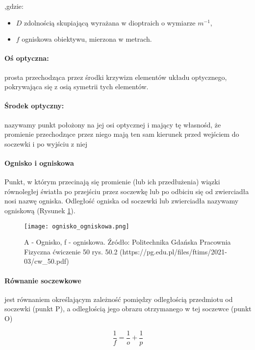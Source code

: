 \documentclass{article}
\begin{document}
,gdzie: 

\renewcommand{\labelitemi}{--}   %
\begin{itemize}
    \item $D$ zdolnością skupiającą wyrażana w dioptraich o wymiarze $m^{-1}$,
    \item $f$ ogniskowa obiektywu, mierzona w metrach.
\end{itemize}

\paragraph{Oś optyczna:}prosta przechodząca przez środki krzywizn elementów układu optycznego, pokrywająca się z osią symetrii tych elementów.

\paragraph{Środek optyczny:}nazywamy punkt położony na jej osi optycznej i mający tę własnośd, że promienie przechodzące przez niego mają ten sam kierunek przed wejściem do soczewki i po wyjściu z niej

\paragraph{Ognisko i ogniskowa}Punkt, w którym przecinają się promienie (lub ich przedłużenia) wiązki równoległej światła po przejściu przez soczewkę lub po odbiciu się od zwierciadła nosi nazwę ogniska. Odległość ogniska od soczewki lub zwierciadła nazywamy ogniskową (Rysunek \ref{fig:ogniskowa}).

\begin{figure}[htbp]
    \centering
    \texttt{[image: ognisko\_ogniskowa.png]}
    \caption{A - Ognisko, f - ogniskowa. Źródło: Politechnika Gdańska Pracownia Fizyczna ćwiczenie 50 rys. 50.2 (https://pg.edu.pl/files/ftims/2021-03/cw\_50.pdf)}
    \label{fig:ogniskowa}
\end{figure}

\paragraph{Równanie soczewkowe} jest równaniem określającym zależność pomiędzy odległością przedmiotu od soczewki (punkt P), a odległością jego obrazu otrzymanego w tej soczewce (punkt O)

\begin{equation}
\frac{1}{f} = \frac{1}{o} + \frac{1}{p}
\label{eq:diopters}
\end{equation}
\end{document}

